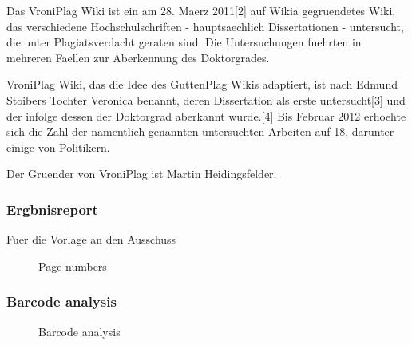 	Das VroniPlag Wiki ist ein am 28. Maerz 2011[2] auf Wikia gegruendetes Wiki, das verschiedene Hochschulschriften - hauptsaechlich Dissertationen - untersucht, die unter Plagiatsverdacht geraten sind. Die Untersuchungen fuehrten in mehreren Faellen zur Aberkennung des Doktorgrades.

VroniPlag Wiki, das die Idee des GuttenPlag Wikis adaptiert, ist nach Edmund Stoibers Tochter Veronica benannt, deren Dissertation als erste untersucht[3] und der infolge dessen der Doktorgrad aberkannt wurde.[4] Bis Februar 2012 erhoehte sich die Zahl der namentlich genannten untersuchten Arbeiten auf 18, darunter einige von Politikern.

Der Gruender von VroniPlag ist Martin Heidingsfelder.	
	
	

		\subsubsection{Ergbnisreport}
		Fuer die Vorlage an den Ausschuss
	 \begin{figure}[!h]
  \centering
  \caption{Page numbers}
  \label{fig:page numbers}
\end{figure}


	\subsubsection{Barcode analysis}
	
	 \begin{figure}[!h]
  \centering
  \caption{Barcode analysis}
  \label{fig:plagawareWebsite}
\end{figure}
	
